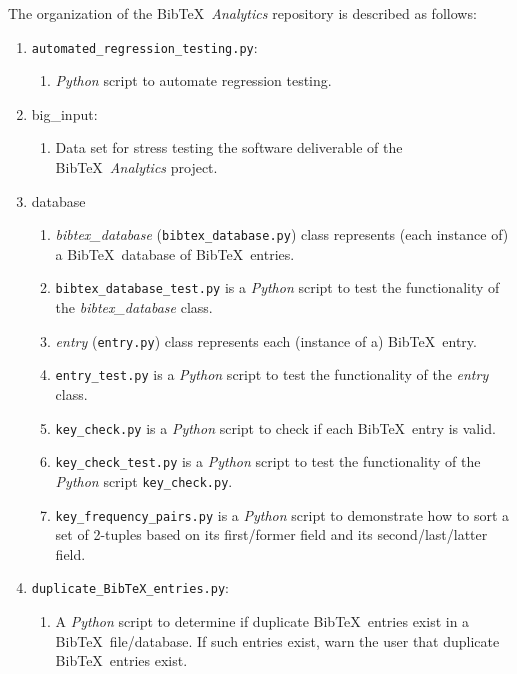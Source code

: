 The organization of the {\sc Bib}\TeX\ {\it Analytics} repository is described as follows: \vspace{-0.3cm}
\begin{enumerate} \itemsep -4pt
\item {\tt automated\_regression\_testing.py}: \vspace{-0.3cm}
	\begin{enumerate} \itemsep -2pt
	\item {\it Python} script to automate regression testing.
	\end{enumerate}
\item big\_input: \vspace{-0.3cm}
	\begin{enumerate} \itemsep -2pt
	\item Data set for stress testing the software deliverable of the {\sc Bib}\TeX\ {\it Analytics} project.
	\end{enumerate}
\item database \vspace{-0.3cm}
	\begin{enumerate} \itemsep -2pt
	\item {\it bibtex\_database} ({\tt bibtex\_database.py}) class represents (each instance of) a {\sc Bib}\TeX\ database of {\sc Bib}\TeX\ entries.
	\item {\tt bibtex\_database\_test.py} is a {\it Python} script to test the functionality of the {\it bibtex\_database} class.
	\item {\it entry} ({\tt entry.py}) class represents each (instance of a) {\sc Bib}\TeX\ entry.
	\item {\tt entry\_test.py} is a {\it Python} script to test the functionality of the {\it entry} class.
	\item {\tt key\_check.py} is a {\it Python} script to check if each {\sc Bib}\TeX\ entry is valid.
	\item {\tt key\_check\_test.py} is a {\it Python} script to test the functionality of the {\it Python} script {\tt key\_check.py}.
	\item {\tt key\_frequency\_pairs.py} is a {\it Python} script to demonstrate how to sort a set of 2-tuples based on its first/former field and its second/last/latter field.
	\end{enumerate}
\item {\tt duplicate\_BibTeX\_entries.py}: \vspace{-0.3cm}
	\begin{enumerate} \itemsep -2pt
	\item A {\it Python} script to determine if duplicate {\sc Bib}\TeX\ entries exist in a {\sc Bib}\TeX\ file/database. If such entries exist, warn the user that duplicate {\sc Bib}\TeX\ entries exist. 

\end{enumerate}
\end{enumerate}
